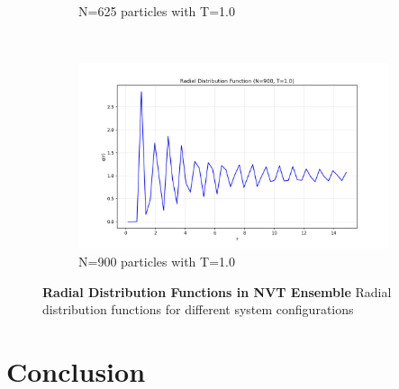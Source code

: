 \begin{figure}[H]
\begin{subfigure}{0.5\textwidth}
		\caption{N=625 particles with T=1.0}
		\label{sfig:nvt_rdf_N625_T10}
	\end{subfigure}%
	~
	\begin{subfigure}{0.5\textwidth}
		\includegraphics[width=\textwidth]{media/rdf_N900_T1.0.png}
		\caption{N=900 particles with T=1.0}
		\label{sfig:nvt_rdf_N900_T10}
	\end{subfigure}%
	\caption{\textbf{Radial Distribution Functions in NVT Ensemble} 
	Radial distribution functions for different system configurations}
	\label{fig:nvt_rdf}
\end{figure}

\section*{Conclusion}
